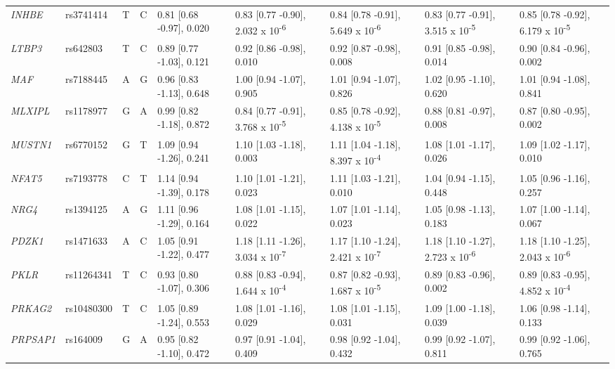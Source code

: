 \documentclass[]{report}
\begin{document}
\begin{landscape}
\begin{table}[!h]
{\begin{threeparttable}
\begin{tabular}[t]{lllllllll}
\em{INHBE} & rs3741414 & T & C & 0.81 [0.68 -0.97], 0.020 & 0.83 [0.77 -0.90], 2.032 x 10\textsuperscript{-6} & 0.84 [0.78 -0.91], 5.649 x 10\textsuperscript{-6} & 0.83 [0.77 -0.91], 3.515 x 10\textsuperscript{-5} & 0.85 [0.78 -0.92], 6.179 x 10\textsuperscript{-5}\\
\em{LTBP3} & rs642803 & T & C & 0.89 [0.77 -1.03], 0.121 & 0.92 [0.86 -0.98], 0.010 & 0.92 [0.87 -0.98], 0.008 & 0.91 [0.85 -0.98], 0.014 & 0.90 [0.84 -0.96], 0.002\\
\em{MAF} & rs7188445 & A & G & 0.96 [0.83 -1.13], 0.648 & 1.00 [0.94 -1.07], 0.905 & 1.01 [0.94 -1.07], 0.826 & 1.02 [0.95 -1.10], 0.620 & 1.01 [0.94 -1.08], 0.841\\
\em{MLXIPL} & rs1178977 & G & A & 0.99 [0.82 -1.18], 0.872 & 0.84 [0.77 -0.91], 3.768 x 10\textsuperscript{-5} & 0.85 [0.78 -0.92], 4.138 x 10\textsuperscript{-5} & 0.88 [0.81 -0.97], 0.008 & 0.87 [0.80 -0.95], 0.002\\
\em{MUSTN1} & rs6770152 & G & T & 1.09 [0.94 -1.26], 0.241 & 1.10 [1.03 -1.18], 0.003 & 1.11 [1.04 -1.18], 8.397 x 10\textsuperscript{-4} & 1.08 [1.01 -1.17], 0.026 & 1.09 [1.02 -1.17], 0.010\\
\em{NFAT5} & rs7193778 & C & T & 1.14 [0.94 -1.39], 0.178 & 1.10 [1.01 -1.21], 0.023 & 1.11 [1.03 -1.21], 0.010 & 1.04 [0.94 -1.15], 0.448 & 1.05 [0.96 -1.16], 0.257\\
\em{NRG4} & rs1394125 & A & G & 1.11 [0.96 -1.29], 0.164 & 1.08 [1.01 -1.15], 0.022 & 1.07 [1.01 -1.14], 0.023 & 1.05 [0.98 -1.13], 0.183 & 1.07 [1.00 -1.14], 0.067\\
\em{PDZK1} & rs1471633 & A & C & 1.05 [0.91 -1.22], 0.477 & 1.18 [1.11 -1.26], 3.034 x 10\textsuperscript{-7} & 1.17 [1.10 -1.24], 2.421 x 10\textsuperscript{-7} & 1.18 [1.10 -1.27], 2.723 x 10\textsuperscript{-6} & 1.18 [1.10 -1.25], 2.043 x 10\textsuperscript{-6}\\
\em{PKLR} & rs11264341 & T & C & 0.93 [0.80 -1.07], 0.306 & 0.88 [0.83 -0.94], 1.644 x 10\textsuperscript{-4} & 0.87 [0.82 -0.93], 1.687 x 10\textsuperscript{-5} & 0.89 [0.83 -0.96], 0.002 & 0.89 [0.83 -0.95], 4.852 x 10\textsuperscript{-4}\\
\em{PRKAG2} & rs10480300 & T & C & 1.05 [0.89 -1.24], 0.553 & 1.08 [1.01 -1.16], 0.029 & 1.08 [1.01 -1.15], 0.031 & 1.09 [1.00 -1.18], 0.039 & 1.06 [0.98 -1.14], 0.133\\
\em{PRPSAP1} & rs164009 & G & A & 0.95 [0.82 -1.10], 0.472 & 0.97 [0.91 -1.04], 0.409 & 0.98 [0.92 -1.04], 0.432 & 0.99 [0.92 -1.07], 0.811 & 0.99 [0.92 -1.06], 0.765\\

\end{tabular}
\end{threeparttable}}
\end{table}
\end{landscape}
\end{document}
